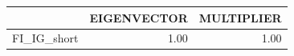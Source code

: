 \begin{tabular}{rrr}
  \hline
 & EIGENVECTOR & MULTIPLIER \\ 
  \hline
FI\_IG\_short & 1.00 & 1.00 \\ 
   \hline
\end{tabular}
